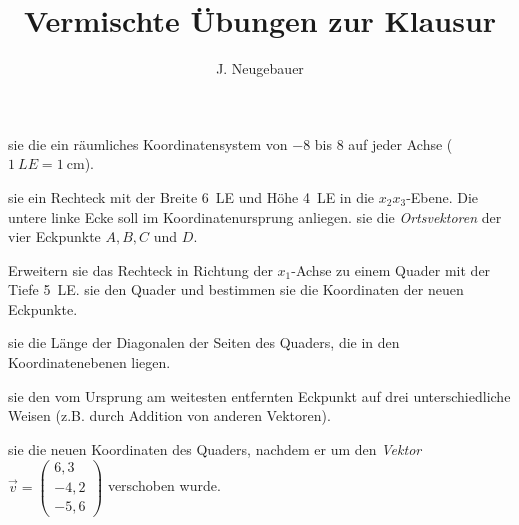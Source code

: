 \documentclass[11pt, a5paper, landscape]{scrartcl}
\author{J. Neugebauer}
\title{Vermischte Übungen zur Klausur}
\date{\Heute}
\begin{document}
	\begin{aufgabe}
		\begin{enumeratea}
			\item {} sie die ein räumliches Koordinatensystem von \num{-8} bis \num{8} auf jeder Achse ($\SI{1}{LE} = \SI{1}{\centi\meter}$).
			
			\item {} sie ein Rechteck mit der Breite \SI{6}{LE} und Höhe \SI{4}{LE} in die $x_2x_3$-Ebene. Die untere linke Ecke soll im Koordinatenursprung anliegen.  sie die \emph{Ortsvektoren} der vier Eckpunkte $A, B, C$ und $D$.
			
			\item Erweitern sie das Rechteck in Richtung der $x_1$-Achse zu einem Quader mit der Tiefe \SI{5}{LE}.  sie den Quader und bestimmen sie die Koordinaten der neuen Eckpunkte.
			
			\item {} sie die Länge der Diagonalen der Seiten des Quaders, die in den Koordinatenebenen liegen.
			
			\item {} sie den vom Ursprung am weitesten entfernten Eckpunkt auf drei unterschiedliche Weisen (z.B. durch Addition von anderen Vektoren).
			
			\item {} sie die neuen Koordinaten des Quaders, nachdem er um den \emph{Vektor} $\vec{v} = \begin{pmatrix} 6,3 \\ -4,2 \\ -5,6 \end{pmatrix}$ verschoben wurde. 
		\end{enumeratea}
	\end{aufgabe}
	\clearpage
		
	\hspace{1em}
	\clearpage
	
\end{document}
